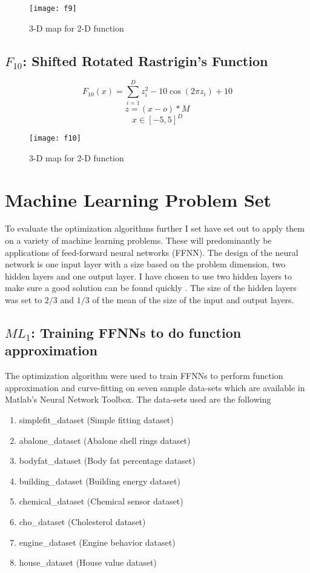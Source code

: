 \begin{figure}[H]
  \centering
  \texttt{[image: f9]}
  \caption{3-D map for 2-D function}
  \label{f9}
\end{figure}

\subsection{$F_{10}$: Shifted Rotated Rastrigin’s Function}

\begin{equation}
  F_{10}(x)=\sum_{i=1}^{D}{z_i^2 - 10\cos{(2\pi z_i)} + 10}
\end{equation}
\[ z=(x-o)*M \]
\[ x \in [-5,5]^D \]

\begin{figure}[H]
  \centering
  \texttt{[image: f10]}
  \caption{3-D map for 2-D function}
  \label{f10}
\end{figure}

\section{Machine Learning Problem Set}

To evaluate the optimization algorithms further I set have set out to apply them on a variety of machine learning problems. These will predominantly be applications of feed-forward neural networks (FFNN). The design of the neural network is one input layer with a size based on the problem dimension, two hidden layers and one output layer. I have chosen to use two hidden layers to make sure a good solution can be found quickly \cite{329294}. The size of the hidden layers was set to $2/3$ and $1/3$ of the mean of the size of the input and output layers.

\subsection{$ML_{1}$: Training FFNNs to do function approximation}

The optimization algorithm were used to train FFNNs to perform function approximation and curve-fitting on seven sample data-sets which are available in Matlab's Neural Network Toolbox. The data-sets used are the following

\begin{enumerate}
  \item simplefit\_dataset (Simple fitting dataset)
  \item abalone\_dataset (Abalone shell rings dataset)
  \item bodyfat\_dataset (Body fat percentage dataset)
  \item building\_dataset (Building energy dataset)
  \item chemical\_dataset (Chemical sensor dataset)
  \item cho\_dataset (Cholesterol dataset)
  \item engine\_dataset (Engine behavior dataset)
  \item house\_dataset (House value dataset)
\end{enumerate}

